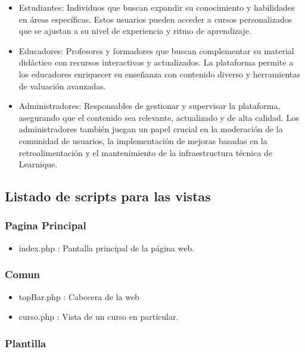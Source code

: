 \documentclass[
]{article}
\providecommand{\tightlist}{%
  \setlength{\itemsep}{0pt}\setlength{\parskip}{0pt}}
\begin{document}
\begin{itemize}
\item
  Estudiantes: Individuos que buscan expandir su conocimiento y
  habilidades en áreas específicas. Estos usuarios pueden acceder a
  cursos personalizados que se ajustan a su nivel de experiencia y ritmo
  de aprendizaje.
\item
  Educadores: Profesores y formadores que buscan complementar su
  material didáctico con recursos interactivos y actualizados. La
  plataforma permite a los educadores enriquecer su enseñanza con
  contenido diverso y herramientas de valuación avanzadas.
\item
  Administradores: Responsables de gestionar y supervisar la plataforma,
  asegurando que el contenido sea relevante, actualizado y de alta
  calidad. Los administradores también juegan un papel crucial en la
  moderación de la comunidad de usuarios, la implementación de mejoras
  basadas en la retroalimentación y el mantenimiento de la
  infraestructura técnica de Learnique.
\end{itemize}

\newpage

\subsection{Listado de scripts para las
vistas}\label{listado-de-scripts-para-las-vistas}

\subsubsection{Pagina Principal}\label{pagina-principal}

\begin{itemize}
\tightlist
\item
  index.php : Pantalla principal de la página web.
\end{itemize}

\subsubsection{Comun}\label{comun}

\begin{itemize}
\item
  topBar.php : Cabecera de la web
\item
  curso.php : Vista de un curso en particular.
\end{itemize}

\subsubsection{Plantilla}\label{plantilla}
\end{document}
